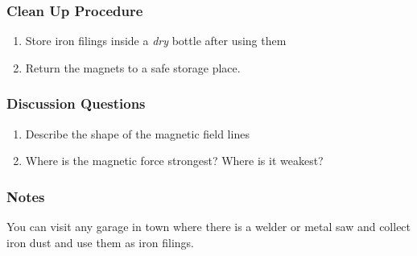 \subsubsection*{Clean Up Procedure}
\begin{enumerate}
\item{Store iron filings inside a \textit{dry} bottle after using them}
\item{Return the magnets to a safe storage place.}
\end{enumerate}

\subsubsection*{Discussion Questions}
\begin{enumerate}
\item{Describe the shape of the magnetic field lines}
\item{Where is the magnetic force strongest?  Where is it weakest?}
\end{enumerate}

\subsubsection*{Notes}
You can visit any garage in town where there is a welder or metal saw and collect iron dust and use them as iron filings.
